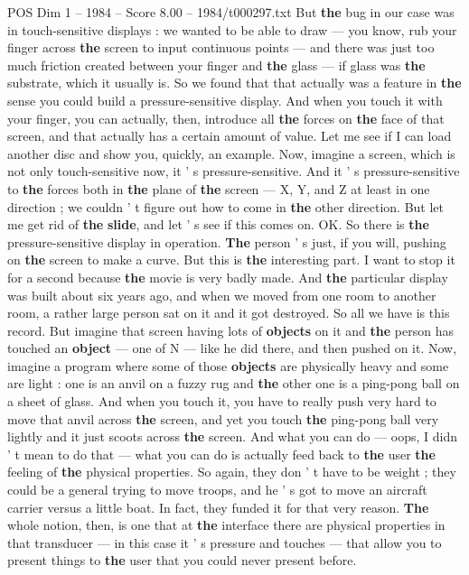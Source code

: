 \begin{textsample}{POS Dim 1 – 1984 – Score 8.00 – 1984/t000297.txt}
But \textbf{the} bug in our case was in touch-sensitive displays : we wanted to be able to draw — you know, rub your finger across \textbf{the} screen to input continuous points — and there was just too much friction created between your finger and \textbf{the} glass — if glass was \textbf{the} substrate, which it usually is.
So we found that that actually was a feature in \textbf{the} sense you could build a pressure-sensitive display.
And when you touch it with your finger, you can actually, then, introduce all \textbf{the} forces on \textbf{the} face of that screen, and that actually has a certain amount of value.
Let me see if I can load another disc and show you, quickly, an example.
Now, imagine a screen, which is not only touch-sensitive now, it ' s pressure-sensitive.
And it ' s pressure-sensitive to \textbf{the} forces both in \textbf{the} plane of \textbf{the} screen — X, Y, and Z at least in one direction ; we couldn ' t figure out how to come in \textbf{the} other direction.
But let me get rid of \textbf{the} \textbf{slide}, and let ' s see if this comes on.
OK.
So there is \textbf{the} pressure-sensitive display in operation. \textbf{The} person ' s just, if you will, pushing on \textbf{the} screen to make a curve.
But this is \textbf{the} interesting part.
I want to stop it for a second because \textbf{the} movie is very badly made.
And \textbf{the} particular display was built about six years ago, and when we moved from one room to another room, a rather large person sat on it and it got destroyed.
So all we have is this record.
But imagine that screen having lots of \textbf{objects} on it and \textbf{the} person has touched an \textbf{object} — one of N — like he did there, and then pushed on it.
Now, imagine a program where some of those \textbf{objects} are physically heavy and some are light : one is an anvil on a fuzzy rug and \textbf{the} other one is a ping-pong ball on a sheet of glass.
And when you touch it, you have to really push very hard to move that anvil across \textbf{the} screen, and yet you touch \textbf{the} ping-pong ball very lightly and it just scoots across \textbf{the} screen.
And what you can do — oops, I didn ' t mean to do that — what you can do is actually feed back to \textbf{the} user \textbf{the} feeling of \textbf{the} physical properties.
So again, they don ' t have to be weight ; they could be a general trying to move troops, and he ' s got to move an aircraft carrier versus a little boat.
In fact, they funded it for that very reason. \textbf{The} whole notion, then, is one that at \textbf{the} interface there are physical properties in that transducer — in this case it ' s pressure and touches — that allow you to present things to \textbf{the} user that you could never present before.

\end{textsample}
